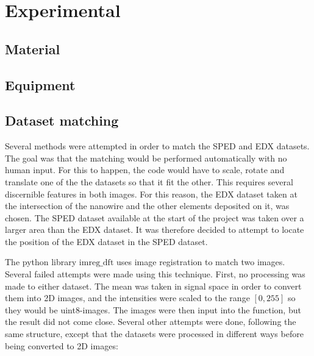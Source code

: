 \chapter{Experimental}

\section{Material}

\section{Equipment}

\section{Dataset matching}
\label{sec:method/dataset matching}

Several methods were attempted in order to match the SPED and EDX datasets. The goal was that the matching would be performed automatically with no human input. For this to happen, the code would have to scale, rotate and translate one of the the datasets so that it fit the other. This requires several discernible features in both images. For this reason, the EDX dataset taken at the intersection of the nanowire and the other elements deposited on it, was chosen. The SPED dataset available at the start of the project was taken over a larger area than the EDX dataset. It was therefore decided to attempt to locate the position of the EDX dataset in the SPED dataset.

The python library $\mathrm{imreg\_dft}$ \cite{imreg_dft} uses image registration to match two images. Several failed attempts were made using this technique. First, no processing was made to either dataset. The mean was taken in signal space in order to convert them into 2D images, and the intensities were scaled to the range $[0,255]$ so they would be uint8-images. The images were then input into the function, but the result did not come close. Several other attempts were done, following the same structure, except that the datasets were processed in different ways before being converted to 2D images:

